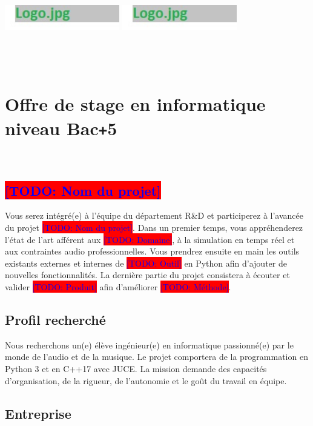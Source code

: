 \documentclass[12pt, a4paper]{article}
\newcommand\todo[1]{\colorbox{red}{\textcolor{blue}{[TODO: #1]}}} %
\begin{document}
\thispagestyle{empty}               %
\begin{center}
    \includegraphics[width=5cm]{../img/logo} \hspace{1cm} \includegraphics[width=5cm]{../img/logo} ~\\~\\~\\~\\
    \section*{Offre de stage en informatique niveau Bac\texttt{+}5}
\end{center}

~\\

\subsection*{\todo{Nom du projet}}

Vous serez intégré(e) à l'équipe du département R\&D et participerez à l'avancée du projet \todo{Nom du projet}.
Dans un premier temps, vous appréhenderez l'état de l'art afférent aux \todo{Domaine}, à la simulation en temps réel et aux contraintes audio professionnelles.
Vous prendrez ensuite en main les outils existants externes et internes de \todo{Outil} en Python afin d'ajouter de nouvelles fonctionnalités.
La dernière partie du projet consistera à écouter et valider \todo{Produit} afin d'améliorer \todo{Méthode}.

\subsection*{Profil recherché}

Nous recherchons un(e) élève ingénieur(e) en informatique passionné(e) par le monde de l'audio et de la musique.
Le projet comportera de la programmation en Python 3 et en C++17 avec JUCE.
La mission demande des capacités d'organisation, de la rigueur, de l'autonomie et le goût du travail en équipe.

\subsection*{Entreprise}
\end{document}
